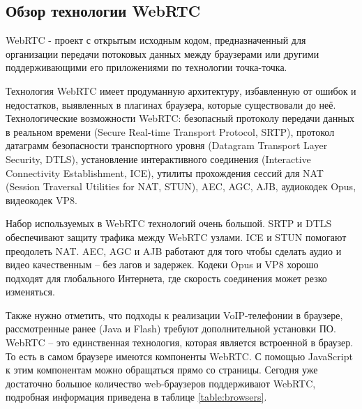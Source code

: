 \subsection{Обзор технологии WebRTC}
\label{subsection:reviewWebRTC}

WebRTC - проект с открытым исходным кодом, предназначенный для организации передачи потоковых данных между браузерами или другими поддерживающими его приложениями по технологии точка-точка.\cite{WebRTC}

Технология WebRTC имеет продуманную архитектуру, избавленную от ошибок и недостатков, выявленных в плагинах браузера, которые существовали до неё. Технологические возможности WebRTC: безопасный протоколу передачи данных в реальном времени (Secure Real-time Transport Protocol, SRTP), протокол датаграмм безопасности транспортного уровня (Datagram Transport Layer Security, DTLS), установление интерактивного соединения (Interactive Connectivity Establishment, ICE), утилиты прохождения сессий для NAT (Session Traversal Utilities for NAT, STUN), AEC, AGC, AJB, аудиокодек Opus, видеокодек VP8.

Набор используемых в WebRTC технологий очень большой. SRTP и DTLS обеспечивают защиту трафика между WebRTC узлами. ICE и STUN помогают преодолеть NAT.\cite{sip_nat} AEC, AGC и AJB работают для того чтобы сделать аудио и видео качественным – без лагов и задержек. Кодеки Opus и VP8 хорошо подходят для глобального Интернета, где скорость соединения может резко изменяться.

Также нужно отметить, что подходы к реализации VoIP-телефонии в браузере, рассмотренные ранее (Java и Flash) требуют дополнительной установки ПО. WebRTC – это единственная технология, которая является встроенной в браузер. То есть в самом браузере имеются компоненты WebRTC. С помощью JavaScript к этим компонентам можно обращаться прямо со страницы. Сегодня уже достаточно большое количество web-браузеров поддерживают WebRTC, подробная информация приведена в таблице \ref{table:browsers}.\cite{browsers_url}

